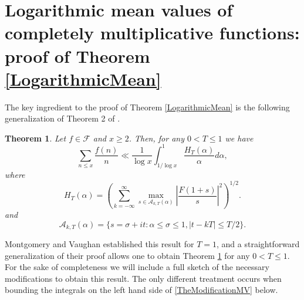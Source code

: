 \documentclass[12pt]{amsart}
\newtheorem{thm}{Theorem}[section]
\theoremstyle{definition}
\numberwithin{equation}{section}
\begin{document}
\section{Logarithmic mean values of completely multiplicative functions: proof of Theorem \ref{LogarithmicMean}}
The key ingredient to the proof of Theorem \ref{LogarithmicMean} is the following generalization of Theorem 2 of  \cite{MV}. 
\begin{thm}\label{MontgomeryVaughan}
Let $f\in \mathcal{F}$ and $x\geq 2$. Then, for any $0<T\leq 1$ we have
$$\sum_{n\leq x} \frac{f(n)}{n}\ll \frac{1}{\log x} \int_{1/\log x}^1 \frac{H_{T}(\alpha)}{\alpha} d\alpha,
$$
where 
$$H_{T}(\alpha)=\left(\sum_{k=-\infty}^{\infty} \max_{s\in \mathcal{A}_{k, T}(\alpha)} \left|\frac{F(1+s)}{s}\right|^2\right)^{1/2}.$$
and 
$$\mathcal{A}_{k,T}(\alpha)=\{s=\sigma+it: \alpha\leq \sigma\leq 1, |t-kT|\leq T/2\}.
$$
\end{thm}
Montgomery and Vaughan \cite{MV} established this result for $T=1$, and a straightforward generalization of their proof allows one to obtain Theorem \ref{MontgomeryVaughan} for any $0<T\leq 1$. For the sake of completeness we will include a full sketch of the necessary modifications to obtain this result. The only different treatment occurs when bounding the integrals on the left hand side of \eqref{TheModificationMV} below.  
\end{document}
